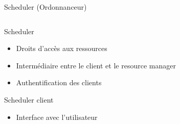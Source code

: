 \documentclass{beamer}
\begin{document}
\begin{frame}{Scheduler (Ordonnanceur)}
\begin{columns}
\begin{column}[r]{0.5\linewidth}
\begin{block}{Scheduler}
\begin{itemize}
            \item Droits d'accès aux ressources 
            \item Intermédiaire entre le client et le resource manager
            \item Authentification des clients 
            \end{itemize}
        \end{block}
        \begin{block}{Scheduler client}
            \begin{itemize}
            \item Interface avec l'utilisateur
            \end{itemize}
        \end{block}
        
	\end{column}
	\end{columns}
    
\end{frame}
\end{document}
